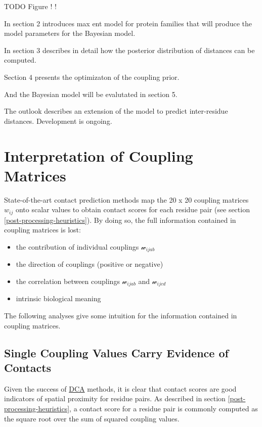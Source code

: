 \documentclass[12pt,a4paper,twoside]{book}
\providecommand{\tightlist}{%
  \setlength{\itemsep}{0pt}\setlength{\parskip}{0pt}}
\newcommand{\wijab}{\mathcal{w}_{ijab}}
\newcommand{\wijcd}{\mathcal{w}_{ijcd}}
\theoremstyle{definition}
\theoremstyle{definition}
\theoremstyle{remark}
\begin{document}
TODO Figure ! !

In section 2 introduces max ent model for protein families that will
produce the model parameters for the Bayesian model.

In section 3 describes in detail how the posterior distribution of
distances can be computed.

Section 4 presents the optimizaton of the coupling prior.

And the Bayesian model will be evalutated in section 5.

The outlook describes an extension of the model to predict inter-residue
distances. Development is ongoing.

\chapter{Interpretation of Coupling
Matrices}\label{interpreting-coupling-matrices}

State-of-the-art contact prediction methods map the 20 x 20 coupling
matrices \(w_{ij}\) onto scalar values to obtain contact scores for each
residue pair (see section \ref{post-processing-heuristics}). By doing
so, the full information contained in coupling matrices is lost:

\begin{itemize}
\tightlist
\item
  the contribution of individual couplings \(\wijab\)
\item
  the direction of couplings (positive or negative)
\item
  the correlation between couplings \(\wijab\) and \(\wijcd\)
\item
  intrinsic biological meaning
\end{itemize}

The following analyses give some intuition for the information contained
in coupling matrices.

\section{Single Coupling Values Carry Evidence of
Contacts}\label{single-coupling-values-carry-evidence-of-contacts}

Given the success of \protect\hyperlink{abbrev}{DCA} methods, it is
clear that contact scores are good indicators of spatial proximity for
residue pairs. As described in section \ref{post-processing-heuristics},
a contact score for a residue pair is commonly computed as the square
root over the sum of squared coupling values.
\end{document}
